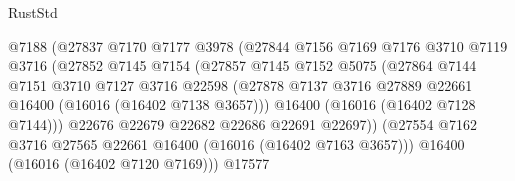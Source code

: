 \begin{lexlean}{RustStd}
\begin{coremodule}
                                    @7188
                                    (@27837
                                      @7170
                                      @7177
                                      @3978
                                      (@27844
                                        @7156
                                        @7169
                                        @7176
                                        @3710
                                        @7119
                                        @3716
                                        (@27852
                                          @7145
                                          @7154
                                          (@27857
                                            @7145
                                            @7152
                                            @5075
                                            (@27864
                                              @7144
                                              @7151
                                              @3710
                                              @7127
                                              @3716
                                              @22598
                                              (@27878
                                                @7137
                                                @3716
                                                @27889
                                                @22661
                                                @16400
                                                (@16016 (@16402 @7138 @3657)))
                                              @16400
                                              (@16016 (@16402 @7128 @7144)))
                                            @22676
                                            @22679
                                            @22682
                                            @22686
                                            @22691
                                            @22697))
                                        (@27554
                                          @7162
                                          @3716
                                          @27565
                                          @22661
                                          @16400
                                          (@16016 (@16402 @7163 @3657)))
                                        @16400
                                        (@16016 (@16402 @7120 @7169)))
                                      @17577

\end{coremodule}
\end{lexlean}
